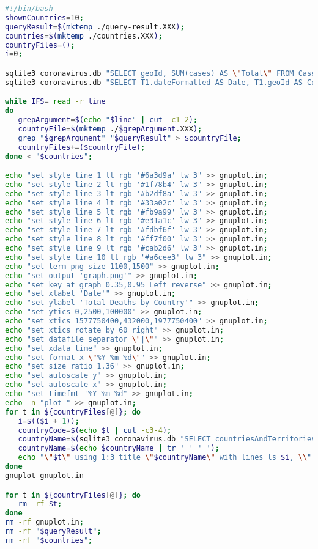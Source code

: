 \documentclass{article}
\begin{document}
\begin{lstlisting}[language=bash, title=plot.sh]
#!/bin/bash
shownCountries=10;
queryResult=$(mktemp ./query-result.XXX);
countries=$(mktemp ./countries.XXX);
countryFiles=();
i=0;

sqlite3 coronavirus.db "SELECT geoId, SUM(cases) AS \"Total\" FROM CaseData GROUP BY geoId ORDER BY Total DESC LIMIT $shownCountries" > $countries;
sqlite3 coronavirus.db "SELECT T1.dateFormatted AS Date, T1.geoId AS Country, SUM(T3.deaths) AS \"Cumulative Deaths\" FROM CaseData AS T1 INNER JOIN ( SELECT geoId, SUM(cases) AS \"Total\" FROM CaseData GROUP BY geoId ORDER BY Total DESC LIMIT $shownCountries ) AS T2 ON Country = T2.geoId INNER JOIN CaseData AS T3 ON T1.dateFormatted >= T3.dateFormatted WHERE Country = T3.geoId GROUP BY Country, Date ORDER BY Country;" > $queryResult;

while IFS= read -r line
do
   grepArgument=$(echo "$line" | cut -c1-2);
   countryFile=$(mktemp ./$grepArgument.XXX);
   grep "$grepArgument" "$queryResult" > $countryFile;
   countryFiles+=($countryFile);
done < "$countries";

echo "set style line 1 lt rgb '#6a3d9a' lw 3" >> gnuplot.in;
echo "set style line 2 lt rgb '#1f78b4' lw 3" >> gnuplot.in;
echo "set style line 3 lt rgb '#b2df8a' lw 3" >> gnuplot.in;
echo "set style line 4 lt rgb '#33a02c' lw 3" >> gnuplot.in;
echo "set style line 5 lt rgb '#fb9a99' lw 3" >> gnuplot.in;
echo "set style line 6 lt rgb '#e31a1c' lw 3" >> gnuplot.in;
echo "set style line 7 lt rgb '#fdbf6f' lw 3" >> gnuplot.in;
echo "set style line 8 lt rgb '#ff7f00' lw 3" >> gnuplot.in;
echo "set style line 9 lt rgb '#cab2d6' lw 3" >> gnuplot.in;
echo "set style line 10 lt rgb '#a6cee3' lw 3" >> gnuplot.in;
echo "set term png size 1100,1500" >> gnuplot.in;
echo "set output 'graph.png'" >> gnuplot.in;
echo "set key at graph 0.35,0.95 Left reverse" >> gnuplot.in;
echo "set xlabel 'Date'" >> gnuplot.in;
echo "set ylabel 'Total Deaths by Country'" >> gnuplot.in;
echo "set ytics 0,2500,100000" >> gnuplot.in;
echo "set xtics 1577750400,432000,1977750400" >> gnuplot.in;
echo "set xtics rotate by 60 right" >> gnuplot.in;
echo "set datafile separator \"|\"" >> gnuplot.in;
echo "set xdata time" >> gnuplot.in;
echo "set format x \"%Y-%m-%d\"" >> gnuplot.in;
echo "set size ratio 1.36" >> gnuplot.in;
echo "set autoscale y" >> gnuplot.in;
echo "set autoscale x" >> gnuplot.in;
echo "set timefmt '%Y-%m-%d" >> gnuplot.in;
echo -n "plot " >> gnuplot.in;
for t in ${countryFiles[@]}; do
   i=$(($i + 1));
   countryCode=$(echo $t | cut -c3-4);
   countryName=$(sqlite3 coronavirus.db "SELECT countriesAndTerritories FROM CountryID WHERE geoId = '$countryCode';");
   countryName=$(echo $countryName | tr '_' ' ');
   echo "\"$t\" using 1:3 title \"$countryName\" with lines ls $i, \\" >> gnuplot.in;
done
gnuplot gnuplot.in

for t in ${countryFiles[@]}; do
   rm -rf $t;
done
rm -rf gnuplot.in;
rm -rf "$queryResult";
rm -rf "$countries";
\end{lstlisting}
\end{document}
